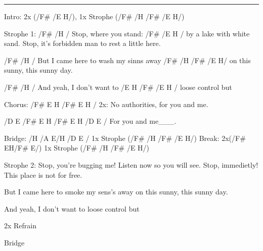 \noindent\rule{\columnwidth}{1pt}

\begin{lstsong}
Intro:  2x (/F#  /E H/), 1x Strophe (/F# /H /F# /E H/)

Strophe 1:
/F#         /H         /
Stop, where you stand:
/F#            /E     H  /
by a lake with white sand.
Stop, it's forbidden man
to rest a little here.

/F#             /H     /
But I came here to
wash my sinns away
/F#       /H        /F#   /E   H/          
on this sunny, this sunny day.

/F#               /H      /
And yeah, I don't want to
/E     H   /F#   /E   H /
loose control           but

Chorus:
    /F#  E    H     /F#  E      H   /
2x: No authorities, for you and me.

/D   E       /F#  E  H  /F#  E  H /D  E /
For you and me___.

Bridge: /H  /A  E/H  /D  E /
1x Strophe (/F# /H /F# /E H/)
Break: 2x(/F# EH/F# E/)
1x Strophe (/F# /H /F# /E H/)

Strophe 2:
Stop, you're bugging me!
Listen now so you will see.
Stop, immedietly!
This place is not for free.

But I came here to
smoke my sens's away
on this sunny, this sunny day.

And yeah, I don't want to
loose control       but

2x Refrain

Bridge
\end{lstsong}
\newpage


